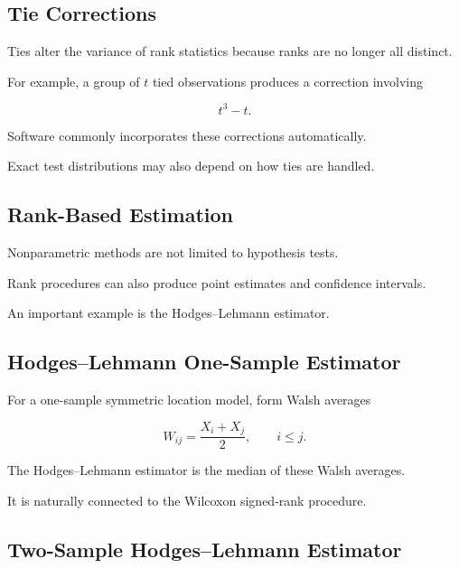 \subsection{Tie Corrections}
\label{subsec:tie-corrections-nonparametric}

Ties alter the variance of rank statistics because ranks are no longer
all distinct.

For example, a group of \(t\) tied observations produces a correction
involving

\[
\boxed{
t^3-t.
}
\]

Software commonly incorporates these corrections automatically.

Exact test distributions may also depend on how ties are handled.

\subsection{Rank-Based Estimation}
\label{subsec:rank-based-estimation}

Nonparametric methods are not limited to hypothesis tests.

Rank procedures can also produce point estimates and confidence
intervals.

An important example is the Hodges--Lehmann estimator.

\subsection{Hodges--Lehmann One-Sample Estimator}
\label{subsec:hodges-lehmann-one-sample}

For a one-sample symmetric location model, form Walsh averages

\[
\boxed{
W_{ij}
=
\frac{
X_i+X_j
}{2},
\qquad
i\leq j.
}
\]

The Hodges--Lehmann estimator is the median of these Walsh averages.

It is naturally connected to the Wilcoxon signed-rank procedure.

\subsection{Two-Sample Hodges--Lehmann Estimator}
\label{subsec:hodges-lehmann-two-sample}

